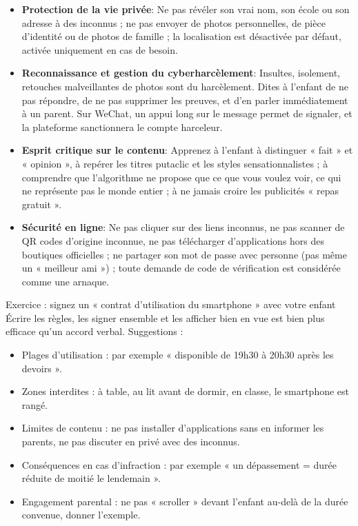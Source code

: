 \begin{itemize}
  \item \textbf{Protection de la vie privée}: Ne pas révéler son vrai nom, son école ou son adresse à des inconnus ; ne pas envoyer de photos personnelles, de pièce d'identité ou de photos de famille ; la localisation est désactivée par défaut, activée uniquement en cas de besoin.
  \item \textbf{Reconnaissance et gestion du cyberharcèlement}: Insultes, isolement, retouches malveillantes de photos sont du harcèlement. Dites à l'enfant de ne pas répondre, de ne pas supprimer les preuves, et d'en parler immédiatement à un parent. Sur WeChat, un appui long sur le message permet de signaler, et la plateforme sanctionnera le compte harceleur.
  \item \textbf{Esprit critique sur le contenu}: Apprenez à l'enfant à distinguer « fait » et « opinion », à repérer les titres putaclic et les styles sensationnalistes ; à comprendre que l'algorithme ne propose que ce que vous voulez voir, ce qui ne représente pas le monde entier ; à ne jamais croire les publicités « repas gratuit ».
  \item \textbf{Sécurité en ligne}: Ne pas cliquer sur des liens inconnus, ne pas scanner de QR codes d'origine inconnue, ne pas télécharger d'applications hors des boutiques officielles ; ne partager son mot de passe avec personne (pas même un « meilleur ami ») ; toute demande de code de vérification est considérée comme une arnaque.
\end{itemize}

\begin{tcbpractice}{Exercice : signez un « contrat d'utilisation du smartphone » avec votre enfant}
Écrire les règles, les signer ensemble et les afficher bien en vue est bien plus efficace qu'un accord verbal. Suggestions :

\begin{itemize}
  \item Plages d'utilisation : par exemple « disponible de 19h30 à 20h30 après les devoirs ».
  \item Zones interdites : à table, au lit avant de dormir, en classe, le smartphone est rangé.
  \item Limites de contenu : ne pas installer d'applications sans en informer les parents, ne pas discuter en privé avec des inconnus.
  \item Conséquences en cas d'infraction : par exemple « un dépassement = durée réduite de moitié le lendemain ».
  \item Engagement parental : ne pas « scroller » devant l'enfant au-delà de la durée convenue, donner l'exemple.
\end{itemize}

\end{tcbpractice}

